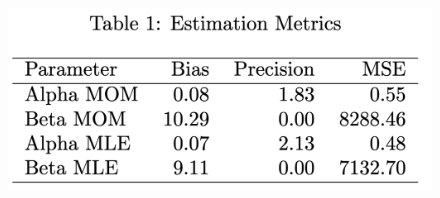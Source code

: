 \documentclass{article}\usepackage[]{graphicx}\usepackage[]{xcolor}
\begin{document}
\begin{figure}[!t]
    \vspace{-2in} %
    \centering
    \includegraphics[width=.75\textwidth]{Table}
    \caption{}
    \label{fig:fourth}
\end{figure}
\end{document}

